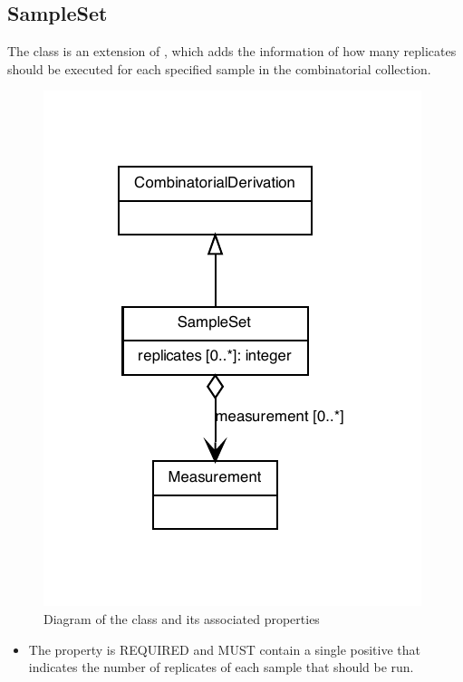 \subsection{SampleSet}
\label{sec:SampleSet}

The  class is an extension of , which adds the information of how many replicates should be executed for each specified sample in the combinatorial collection.

\begin{figure}[ht]
\begin{center}
\includegraphics[scale=0.8]{figures/SampleSet}
\caption[]{Diagram of the  class and its associated properties}
\label{uml:SampleSet}
\end{center}
\end{figure}

\begin{itemize}
\item \label{sec:replicates}
The  property is REQUIRED and MUST contain a single positive  that indicates the number of replicates of each sample that should be run.
\end{itemize}


